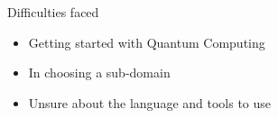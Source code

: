 \documentclass[10 pt]{beamer}
\begin{document}
\begin{frame}{Difficulties faced}
	\begin{itemize}
		\item Getting started with Quantum Computing
        \item In choosing a sub-domain
        \item Unsure about the language and tools to use
	\end{itemize}
\end{frame}
		
\end{document}
